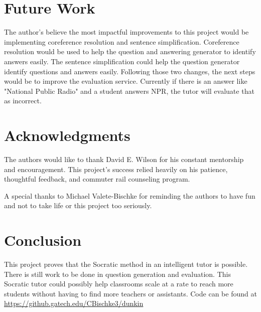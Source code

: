 \documentclass{sigchi}
\begin{document}
  \section{Future Work}

  The author's believe the most impactful improvements to this project would be implementing coreference resolution and sentence simplification. Coreference resolution would be used to help the question and answering generator to identify answers easily. The sentence simplification could help the question generator identify questions and answers easily. Following those two changes, the next steps would be to improve the evaluation service. Currently if there is an answer like "National Public Radio" and a student answers NPR, the tutor will evaluate that as incorrect.

  \section{Acknowledgments}


  The authors would like to thank David E. Wilson for his constant mentorship and encouragement. This project's success relied heavily on his patience, thoughtful feedback, and commuter rail counseling program.

  A special thanks to Michael Valete-Bischke for reminding the authors to have fun and not to take life or this project too seriously.
  
  \section{Conclusion}
  This project proves that the Socratic method in an intelligent tutor is possible. There is still work to be done in question generation and evaluation. This Socratic tutor could possibly help classrooms scale at a rate to reach more students without having to find more teachers or assistants. Code can be found at \url{https://github.gatech.edu/CBischke3/dunkin}
\end{document}
